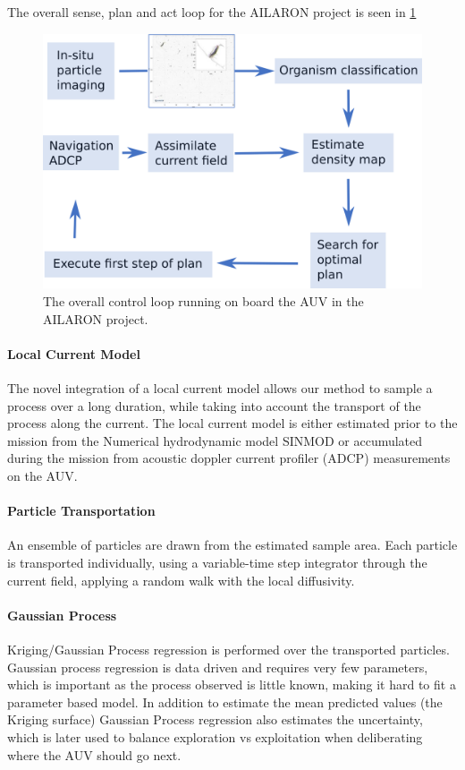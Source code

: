 \documentclass[conference]{IEEEtran}
\begin{document}
The overall sense, plan and act loop for the AILARON project is seen in \cref{fig:sensePlanActLoop}

\begin{figure}[tbp]
\centerline{\includegraphics[width=0.9\linewidth]{figures/workflow-simplified.png}}
\caption{The overall control loop running on board the AUV in the AILARON project.}
\label{fig:sensePlanActLoop}
\end{figure}

\paragraph{Local Current Model}
The novel integration of a local current model allows our method to sample a process over a long duration, while taking into account the transport of the process along the current.
The local current model is either estimated prior to the mission from the Numerical hydrodynamic model SINMOD or accumulated during the mission from acoustic doppler current profiler (ADCP) measurements on the AUV.

\paragraph{Particle Transportation}
An ensemble of particles are drawn from the estimated sample area. 
Each particle is transported individually, using a variable-time step integrator through the current field, applying a random walk with the local diffusivity.

\paragraph{Gaussian Process}
Kriging/Gaussian Process regression is performed over the transported particles.
Gaussian process regression is data driven and requires very few parameters, which is important as the process observed is little known, making it hard to fit a parameter based model.
In addition to estimate the mean predicted values (the Kriging surface) Gaussian Process regression also estimates the uncertainty, which is later used to balance exploration vs exploitation when deliberating where the AUV should go next.
\end{document}
